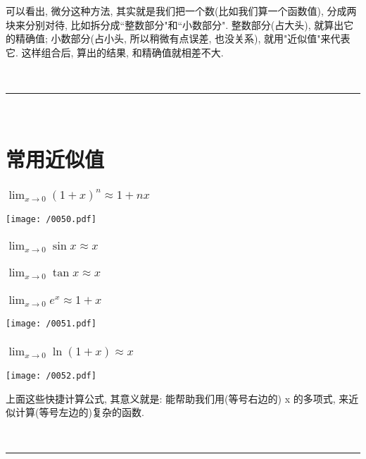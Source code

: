 \documentclass[UTF8]{ctexart}
\begin{document}
可以看出, 微分这种方法, 其实就是我们把一个数(比如我们算一个函数值), 分成两块来分别对待, 比如拆分成``整数部分"和``小数部分". 整数部分(占大头), 就算出它的精确值; 小数部分(占小头, 所以稍微有点误差, 也没关系), 就用"近似值"来代表它.  这样组合后, 算出的结果, 和精确值就相差不大.



~\\
\hrule
~\\	


\section{常用近似值}

\subsubsection{$\lim_{x\rightarrow 0}\left( 1+x \right) ^n\approx 1+nx$}

\texttt{[image: /0050.pdf]}



\subsubsection{$\lim_{x\rightarrow 0}\sin x\approx x$}


\subsubsection{$\lim_{x\rightarrow 0}\tan x\approx x$}

\subsubsection{$\lim_{x\rightarrow 0}e^x\approx 1+x$}

\texttt{[image: /0051.pdf]}



\subsubsection{$\lim_{x\rightarrow 0}\ln \left( 1+x \right) \approx x$}

\texttt{[image: /0052.pdf]}

上面这些快捷计算公式, 其意义就是: 能帮助我们用(等号右边的) x 的多项式, 来近似计算(等号左边的)复杂的函数.


~\\
\hrule
~\\	
\end{document}
